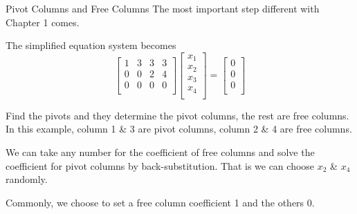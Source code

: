 \documentclass{beamer}
\begin{document}
\begin{frame}{Pivot Columns and Free Columns}
The most important step different with Chapter 1 comes.

\vspace{3pt}
The simplified equation system becomes
\begin{equation*}
    \left[ \begin{matrix}
        1&		3&		3&		3\\
        0&		0&		2&		4\\
        0&		0&		0&		0\\
    \end{matrix} \right] \left[ \begin{array}{c}
        x_1\\
        x_2\\
        x_3\\
        x_4\\
    \end{array} \right] =\left[ \begin{array}{c}
        0\\
        0\\
        0\\
    \end{array} \right]
\end{equation*}

Find the pivots and they determine the pivot columns, the rest are free columns. In this example, column 1 \& 3 are pivot columns, column 2 \& 4 are free columns.

\vspace{3pt}
We can take any number for the coefficient of free columns and solve the coefficient for pivot columns by back-substitution. That is we can choose $x_2$ \& $x_4$ randomly.

\vspace{3pt}
Commonly, we choose to set a free column coefficient 1 and the others 0.
\end{frame}
\end{document}
